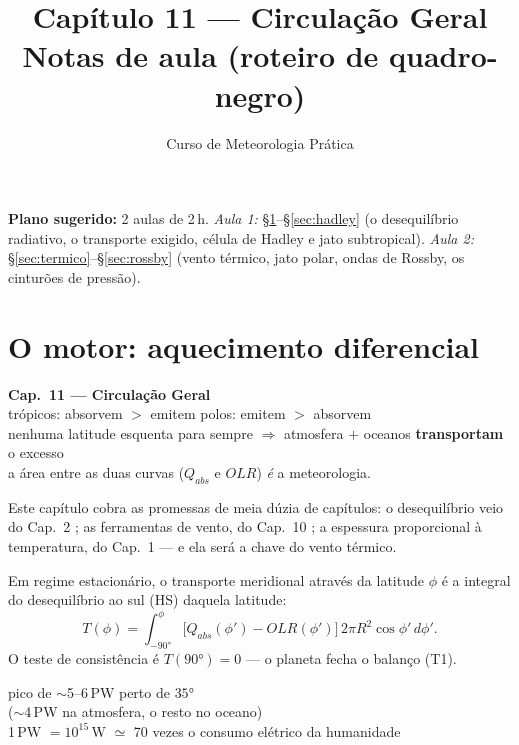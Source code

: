 \documentclass[11pt]{article}
\title{Capítulo 11 --- Circulação Geral\\
{\large Notas de aula (roteiro de quadro-negro)}}
\author{Curso de Meteorologia Prática}
\date{}
\begin{document}
\maketitle
\thispagestyle{fancy}

\noindent\textbf{Plano sugerido:} 2 aulas de 2\,h.
\emph{Aula 1:} \S\ref{sec:motor}--\S\ref{sec:hadley} (o desequilíbrio
radiativo, o transporte exigido, célula de Hadley e jato subtropical).
\emph{Aula 2:} \S\ref{sec:termico}--\S\ref{sec:rossby} (vento térmico,
jato polar, ondas de Rossby, os cinturões de pressão).

\section{O motor: aquecimento diferencial}\label{sec:motor}

\begin{noquadro}[abertura]
\textbf{Cap.~11 --- Circulação Geral}\\[2pt]
trópicos: absorvem $>$ emitem \qquad polos: emitem $>$ absorvem\\
nenhuma latitude esquenta para sempre $\Rightarrow$ atmosfera $+$
oceanos \textbf{transportam} o excesso\\[2pt]
a área entre as duas curvas ($Q_{abs}$ e $OLR$) \emph{é} a meteorologia.
\end{noquadro}


Este capítulo cobra as promessas de meia dúzia de capítulos: o
desequilíbrio veio do Cap.~2 ; as
ferramentas de vento, do Cap.~10 ;
a espessura proporcional à temperatura, do Cap.~1
 — e ela será a chave do vento térmico.

\begin{formadif}
Em regime estacionário, o transporte meridional através da latitude
$\phi$ é a integral do desequilíbrio ao sul (HS) daquela latitude:
\[ T(\phi) = \int_{-90°}^{\phi} \bigl[Q_{abs}(\phi') - OLR(\phi')\bigr]\,
   2\pi R^2\cos\phi'\,d\phi'. \]
O teste de consistência é $T(90°) = 0$ — o planeta fecha o balanço
(T1).
\end{formadif}

\begin{noquadro}
pico de $\sim$5--6\,PW perto de $35°$\\
($\sim$4\,PW na atmosfera, o resto no oceano)\\[2pt]
1\,PW $= 10^{15}$\,W $\simeq$ 70 vezes o consumo elétrico da humanidade
\end{noquadro}
\end{document}
